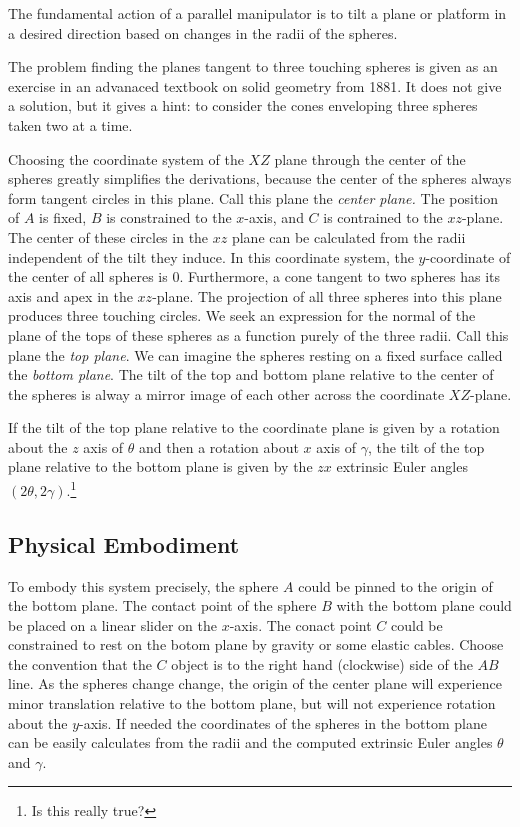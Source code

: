 \documentclass{article}
\begin{document}
The fundamental action of a parallel manipulator is to tilt a plane or platform in a desired direction based
on changes in the radii of the spheres.

The problem finding the planes tangent to three touching spheres
is given as an exercise in an advanaced textbook on solid geometry from 1881\cite{payne1881}. It does not give a solution, but it gives a hint: to consider the cones enveloping
three spheres taken two at a time.

Choosing the coordinate system of the $XZ$ plane through the center of the spheres greatly
simplifies the derivations, because the center of the spheres always form tangent circles
in this plane. Call this plane the {\em center plane.} The position of $A$ is fixed, $B$ is constrained to the $x$-axis, and
$C$ is contrained to the $xz$-plane. The center of these circles in the $xz$ plane can be
calculated from the radii independent of the tilt they induce.
In this coordinate system, the $y$-coordinate of the center of all spheres is $0$.
Furthermore, a cone tangent to two spheres has its axis and apex in the $xz$-plane.
The projection of all three spheres into this plane produces three touching circles.
We seek an expression for the normal of the plane of the tops of these spheres as a function
purely of the three radii. Call this plane the {\em top plane}.
We can imagine the spheres resting on a fixed surface called the {\em bottom plane}.
The tilt of the top and bottom plane relative to the center of the spheres
is alway a mirror image of each other across the coordinate $XZ$-plane.

If the tilt of the top plane relative to the coordinate plane is given by a rotation about the $z$ axis of $\theta$ and
then a rotation about $x$ axis of $\gamma$, the tilt of the top plane relative
to the bottom plane is given by the $zx$ extrinsic Euler angles $(2\theta, 2\gamma)$.\footnote{Is this really true?}

\subsection{Physical Embodiment}

To embody this system precisely, the sphere $A$ could be pinned to
the origin of the bottom plane.
The contact point of the sphere $B$ with the bottom plane
could be placed on a
linear slider on the $x$-axis.
The conact point $C$ could be constrained to
rest on the botom plane by gravity or some elastic cables.
Choose the convention that the $C$ object is to the right hand
(clockwise)
side of the $AB$ line.
As the spheres
change change, the origin of the center plane will experience minor translation
relative to the bottom plane, but will not experience rotation about the $y$-axis.
If needed the coordinates of the spheres in the bottom plane can be easily
calculates from the radii and the computed extrinsic Euler angles $\theta$ and $\gamma$.
\end{document}

